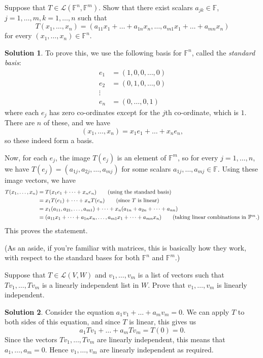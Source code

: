 \documentclass[12pt]{article}
\theoremstyle{definition}
\theoremstyle{definition}
\newtheorem*{soln}{Solution}
\newcommand{\F}{\mathbb{F}}
\begin{document}
\break

\begin{prob}[Axler 3.A.3]
Suppose that $T\in \mathcal{L}(\F^n,\F^m)$. Show that there exist scalars $a_{jk}\in\F$, $j=1,\dots,m,k=1,\dots,n$ such that
\[T(x_1,\dots,x_n)=(a_{11}x_1+\dots+a_{1n}x_n,\dots,a_{m1}x_1+\dots+a_{mn}x_n)\]
for every $(x_1,\dots,x_n)\in\F^n$.
\end{prob}

\begin{soln}
To prove this, we use the following basis for $\F^n$, called the \emph{standard basis}:
\begin{align*}
e_1 &= (1,0,0,\dots,0)\\
e_2 &= (0,1,0,\dots,0)\\
\vdots\\
e_n &= (0,\dots,0,1) 
\end{align*}
where each $e_j$ has zero co-ordinates except for the $j$th co-ordinate, which is $1$. There are $n$ of these, and we have
\[(x_1,\dots,x_n)=x_1e_1+\dots+x_ne_n,\]
so these indeed form a basis.

Now, for each $e_j$, the image $T(e_j)$ is an element of $\F^m$, so for every $j=1,\dots,n$, we have $T(e_j)=(a_{1j},a_{2j},\dots,a_{mj})$ for some scalars $a_{1j},\dots,a_{mj}\in\F$. Using these image vectors, we have
\begin{align*}
T(x_1,\ldots,x_n) &= T(x_1e_1+\dots+x_ne_n) \tag{using the standard basis}\\
&= x_1T(e_1)+\dots+x_nT(e_n) \tag{since $T$ is linear}\\
&= x_1(a_{11},a_{21},\dots,a_{m1})+\dots+x_n(a_{1n}+a_{2n}+\dots+a_{nn})\\
&= (a_{11}x_1+\dots+a_{1n}x_n,\dots,a_{m1}x_1+\dots+a_{mn}x_n) \tag{taking linear combinations in $\F^m$.}
\end{align*}
This proves the statement.

{\small(As an aside, if you're familiar with matrices, this is basically how they work, with respect to the standard bases for both $\F^n$ and $\F^m$.)}
\end{soln}

\begin{prob}[Axler 3.A.4]
Suppose that $T\in\mathcal{L}(V,W)$ and $v_1,\dots,v_m$ is a list of vectors such that $Tv_1,\dots,Tv_m$ is a linearly independent list in $W$. Prove that $v_1,\dots,v_m$ is linearly independent.
\end{prob}

\begin{soln}
Consider the equation $a_1v_1+\dots+a_mv_m=0$. We can apply $T$ to both sides of this equation, and since $T$ is linear, this gives us
\[a_1Tv_1+\dots+a_mTv_m = T(0)=0.\]
Since the vectors $Tv_1,\dots,Tv_m$ are linearly independent, this means that $a_1,\dots,a_m=0$. Hence $v_1,\dots,v_m$ are linearly independent as required.
\end{soln}
\end{document}
